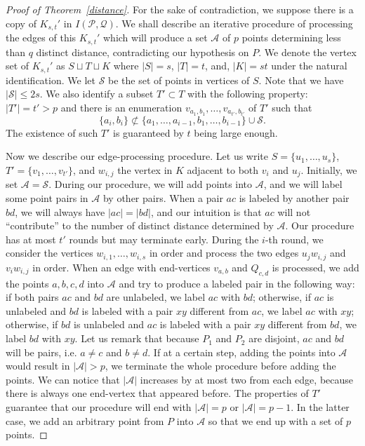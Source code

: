 \documentclass[11pt]{article}
\theoremstyle{definition}
\begin{document}
\begin{proof}[Proof of Theorem~\ref{distance}]
For the sake of contradiction, we suppose there is a copy of $K_{s,t}'$ in $I(\mathcal{P}, \mathcal{Q})$. We shall describe an iterative procedure of processing the edges of this $K_{s,t}'$ which will produce a set $\mathcal{A}$ of $p$ points determining less than $q$ distinct distance, contradicting our hypothesis on $P$. We denote the vertex set of $K_{s,t}'$ as $S \sqcup T\sqcup K$ where $|S| = s$, $|T|=t$, and, $|K|=st$ under the natural identification. We let $\mathcal{S}$ be the set of points in vertices of $S$. Note that we have $|\mathcal{S}| \leq 2s$. We also identify a subset $T' \subset T$ with the following property: $|T'| = t' > p$ and there is an enumeration $v_{a_1, b_1}, \dots, v_{a_{t'}, b_{t'}}$ of $T'$ such that\begin{equation*}
    \{ a_i, b_i \} \not \subset \{ a_1, \ldots, a_{i-1}, b_1, \ldots, b_{i-1}\} \cup \mathcal{S}.
\end{equation*} The existence of such $T'$ is guaranteed by $t$ being large enough.

Now we describe our edge-processing procedure. Let us write $S = \{u_1,\dots, u_s\}$, $T'=\{v_1,\dots, v_{t'}\}$, and $w_{i,j}$ the vertex in $K$ adjacent to both $v_i$ and $u_j$. Initially, we set $\mathcal{A} = \mathcal{S}$. During our procedure, we will add points into $\mathcal{A}$, and we will label some point pairs in $\mathcal{A}$ by other pairs. When a pair $ac$ is labeled by another pair $bd$, we will always have $|ac| = |bd|$, and our intuition is that $ac$ will not ``contribute'' to the number of distinct distance determined by $\mathcal{A}$. Our procedure has at most $t'$ rounds but may terminate early. During the $i$-th round, we consider the vertices $w_{i,1},\dots, w_{i,s}$ in order and process the two edges $u_jw_{i,j}$ and $v_iw_{i,j}$ in order. When an edge with end-vertices $v_{a,b}$ and $Q_{c,d}$ is processed, we add the points $a,b,c,d$ into $\mathcal{A}$ and try to produce a labeled pair in the following way: if both pairs $ac$ and $bd$ are unlabeled, we label $ac$ with $bd$; otherwise, if $ac$ is unlabeled and $bd$ is labeled with a pair $xy$ different from $ac$, we label $ac$ with $xy$; otherwise, if $bd$ is unlabeled and $ac$ is labeled with a pair $xy$ different from $bd$, we label $bd$ with $xy$. Let us remark that because $P_1$ and $P_2$ are disjoint, $ac$ and $bd$ will be pairs, i.e. $a\neq c$ and $b\neq d$. If at a certain step, adding the points into $\mathcal{A}$ would result in $|\mathcal{A}| > p$, we terminate the whole procedure before adding the points. We can notice that $|\mathcal{A}|$ increases by at most two from each edge, because there is always one end-vertex that appeared before. The properties of $T'$ guarantee that our procedure will end with $|\mathcal{A}| = p$ or $|\mathcal{A}| = p-1$. In the latter case, we add an arbitrary point from $P$ into $\mathcal{A}$ so that we end up with a set of $p$ points.


\end{proof}
\end{document}
